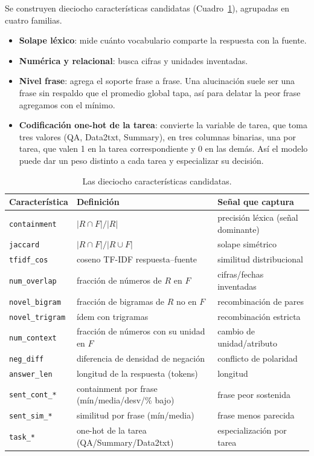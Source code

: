 \documentclass[12pt,a4paper]{report}
\theoremstyle{definition}
\newcommand{\tc}[1]{\texttt{#1}}
\begin{document}
Se construyen dieciocho características candidatas (Cuadro~\ref{tab:feats}), agrupadas en cuatro familias. 
\begin{itemize}
  \item \textbf{Solape léxico}: mide cuánto vocabulario comparte la respuesta con la fuente.
  \item \textbf{Numérica y relacional}: busca cifras y unidades inventadas.
  \item \textbf{Nivel frase}: agrega el soporte frase a frase. Una alucinación suele ser
        una frase sin respaldo que el promedio global tapa, así para delatar la peor frase agregamos con el
        mínimo.
  \item \textbf{Codificación one-hot de la tarea}: convierte la variable de tarea, que
        toma tres valores (QA, Data2txt, Summary), en tres columnas binarias, una por tarea,
        que valen 1 en la tarea correspondiente y 0 en las demás. Así el modelo puede dar un peso
        distinto a cada tarea y especializar su decisión.
\end{itemize}

\begin{table}[H]
  \centering
  \small
  \begin{tabular}{lp{5.1cm}p{5.0cm}}
  \toprule
  Característica & Definición & Señal que captura \\
  \midrule
  \tc{containment} & $|R\cap F|/|R|$ & precisión léxica (señal dominante) \\
  \tc{jaccard} & $|R\cap F|/|R\cup F|$ & solape simétrico \\
  \tc{tfidf\_cos} & coseno TF-IDF respuesta--fuente & similitud distribucional \\
  \tc{num\_overlap} & fracción de números de $R$ en $F$ & cifras/fechas inventadas \\
  \tc{novel\_bigram} & fracción de bigramas de $R$ no en $F$ & recombinación de pares \\
  \tc{novel\_trigram} & ídem con trigramas & recombinación estricta \\
  \tc{num\_context} & fracción de números con su unidad en $F$ & cambio de unidad/atributo \\
  \tc{neg\_diff} & diferencia de densidad de negación & conflicto de polaridad \\
  \tc{answer\_len} & longitud de la respuesta (tokens) & longitud \\
  \tc{sent\_cont\_*} & containment por frase (mín/media/desv/\% bajo) & frase peor sostenida \\
  \tc{sent\_sim\_*} & similitud por frase (mín/media) & frase menos parecida \\
  \tc{task\_*} & one-hot de la tarea (QA/Summary/Data2txt) & especialización por tarea \\
  \bottomrule
  \end{tabular}
  \caption{Las dieciocho características candidatas.}
  \label{tab:feats}
  \end{table}
\end{document}
